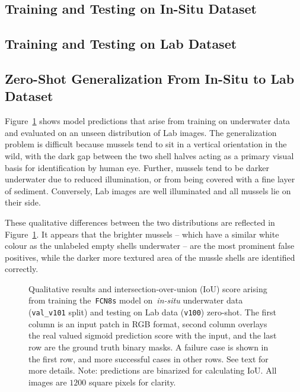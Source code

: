 \documentclass[11pt]{article} %
\begin{document}
\subsection{Training and Testing on In-Situ Dataset}

\subsection{Training and Testing on Lab Dataset}

\subsection{Zero-Shot Generalization From In-Situ to Lab Dataset}

Figure~\ref{fig:zero-shot-situ-lab} shows model predictions that arise from
training on underwater data and evaluated on an unseen distribution of Lab
images. The generalization problem is difficult because mussels tend to sit in a
vertical orientation in the wild, with the dark gap between the two shell
halves acting as a primary visual basis for identification by human eye. 
Further, mussels tend to be darker underwater due to reduced illumination, or
from being covered with a fine layer of sediment. Conversely, Lab images are 
well illuminated and all mussels lie on their side. 

These qualitative differences between the two distributions are 
reflected in Figure~\ref{fig:zero-shot-situ-lab}. It appears that the brighter 
mussels -- which have a similar white colour as the unlabeled empty shells
underwater -- are the most prominent false positives, while the darker more 
textured area of the mussle shells are identified correctly.

\newcommand{\zshot}{./img/situ_to_lab/}

\begin{figure}
\centering
{}

\caption{Qualitative results and intersection-over-union (IoU) score arising
from training the~\texttt{FCN8s} model on~\emph{in-situ} underwater data
(\texttt{val\_v101} split) and testing on Lab data (\texttt{v100}) zero-shot. 
The first column is an input patch in RGB format, second column 
overlays the real valued sigmoid prediction score with the input, and the last 
row are the ground truth binary masks. A failure case is shown in the first
row, and more successful cases in other rows. See text for more details. 
Note: predictions are binarized for calculating IoU. All images are $1200$
square pixels for clarity.}
\label{fig:zero-shot-situ-lab}
\end{figure}
\end{document}
